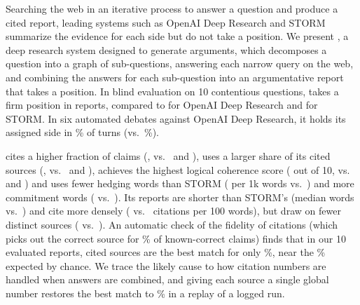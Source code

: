 Searching the web in an iterative process to answer a question and produce a cited report, leading systems such as OpenAI Deep Research and STORM summarize the evidence for each side but do not take a position. We present \sys{}, a deep research system designed to generate arguments, which decomposes a question into a graph of sub-questions, answering each narrow query on the web, and combining the answers for each sub-question into an argumentative report that takes a position. In blind evaluation on 10 contentious questions, \sys{} takes a firm position in \humStanceDC{} reports, compared to \humStanceOAI{} for OpenAI Deep Research and \humStanceStorm{} for STORM. In six automated debates against OpenAI Deep Research, it holds its assigned side in \autoStanceDC\% of turns (vs.\ \autoStanceOAI\%).

\sys{} cites a higher fraction of claims (\humSupportedDC, vs.\ \humSupportedOAI{} and \humSupportedStorm), uses a larger share of its cited sources (\humUtilDC, vs.\ \humUtilOAI{} and \humUtilStorm), achieves the highest logical coherence score (\humLogicDC{} out of 10, vs.\ \humLogicOAI{} and \humLogicStorm) and uses fewer hedging words than STORM (\txHedgeDc{} per 1k words vs.\ \txHedgeSt) and more commitment words (\txCommitDc{} vs.\ \txCommitSt). Its reports are shorter than STORM's (median \txWordsDc{} words vs.\ \txWordsSt) and cite more densely (\txCiteDensityDc{} vs.\ \txCiteDensitySt{} citations per 100 words), but draw on fewer distinct sources (\txSourcesDc{} vs.\ \txSourcesSt). An automatic check of the fidelity of citations (which picks out the correct source for \atValBestCitedPct\% of known-correct claims) finds that in our 10 evaluated reports, cited sources are the best match for only \atEvalBestCitedPct\%, near the \atEvalBestChancePct\% expected by chance. We trace the likely cause to how citation numbers are handled when answers are combined, and giving each source a single global number restores the best match to \atFixBestCitedPct\% in a replay of a logged run.
